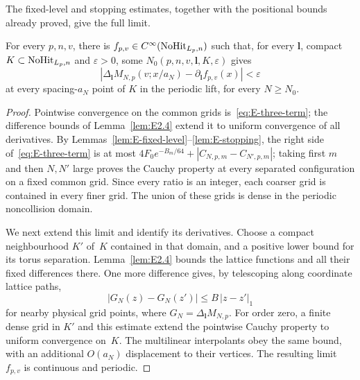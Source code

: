 

The fixed-level and stopping estimates, together with the positional bounds already proved, give the full limit.
\begin{lemma}\label{lem:E3.1}
For every $p,n,v$, there is $f_{p,v}\in C^\infty(\mathrm{NoHit}_{L_p,n})$ such that, for every $\boldsymbol l$, compact $K\subset\mathrm{NoHit}_{L_p,n}$ and $\varepsilon>0$, some $N_0(p,n,v,\boldsymbol l,K,\varepsilon)$ gives
\begin{equation*}
|\Delta_{\boldsymbol l}M_{N,p}(v;x/a_N)-\partial_{\boldsymbol l}f_{p,v}(x)|<\varepsilon
\end{equation*}
at every spacing-$a_N$ point of $K$ in the periodic lift, for every $N\ge N_0$.
\end{lemma}
\begin{proof}
Pointwise convergence on the common grids is~\eqref{eq:E-three-term}; the difference bounds of Lemma~\ref{lem:E2.4} extend it to uniform convergence of all derivatives. By Lemmas~\ref{lem:E-fixed-level}--\ref{lem:E-stopping}, the right side of~\eqref{eq:E-three-term} is at most $4F_0e^{-B_m/64}+|C_{N,p,m}-C_{N',p,m}|$; taking first $m$ and then $N,N'$ large proves the Cauchy property at every separated configuration on a fixed common grid. Since every ratio is an integer, each coarser grid is contained in every finer grid. The union of these grids is dense in the periodic noncollision domain.

We next extend this limit and identify its derivatives. Choose a compact neighbourhood $K'$ of~$K$ contained in that domain, and a positive lower bound for its torus separation. Lemma~\ref{lem:E2.4} bounds the lattice functions and all their fixed differences there. One more difference gives, by telescoping along coordinate lattice paths,
\begin{equation*}
|G_N(z)-G_N(z')|\le B\,|z-z'|_1
\end{equation*}
for nearby physical grid points, where $G_N=\Delta_{\boldsymbol l}M_{N,p}$. For order zero, a finite dense grid in $K'$ and this estimate extend the pointwise Cauchy property to uniform convergence on~$K$. The multilinear interpolants obey the same bound, with an additional $O(a_N)$ displacement to their vertices. The resulting limit~$f_{p,v}$ is continuous and periodic.


\end{proof}
